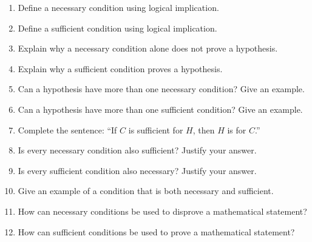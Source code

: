 \documentclass{essay}
\begin{document}
\begin{enumerate}
\item Define a necessary condition using logical implication.
\item Define a sufficient condition using logical implication.
\item Explain why a necessary condition alone does not prove a hypothesis.
\item Explain why a sufficient condition proves a hypothesis.
\item Can a hypothesis have more than one necessary condition? Give an example.
\item Can a hypothesis have more than one sufficient condition? Give an example.
\item Complete the sentence: ``If $C$ is sufficient for $H$, then $H$ is \underline{\hspace{2cm}} for $C$.''
\item Is every necessary condition also sufficient? Justify your answer.
\item Is every sufficient condition also necessary? Justify your answer.
\item Give an example of a condition that is both necessary and sufficient.
\item How can necessary conditions be used to disprove a mathematical statement?
\item How can sufficient conditions be used to prove a mathematical statement?
\end{enumerate}
\end{document}
